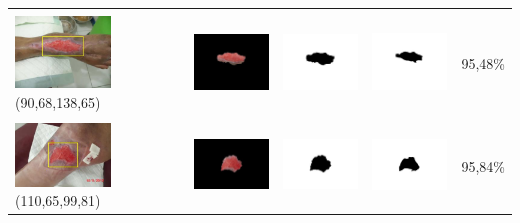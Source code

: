 \begin{table}[H]
\begin{tabular}{|m{1.0in}|m{1.0in}|m{1.0in}|m{1.0in}|m{0.6in}|}
		&  &  & \\
		\includegraphics[width=1.0in]{gambar/hasil_segmentasi/luka_merah/image_6_rect.jpg} {\centering\fontsize{10}{10}\selectfont(90,68,138,65)}&
		\includegraphics[width=1.0in]{gambar/hasil_segmentasi/luka_merah/result_6.jpg}&
		\includegraphics[width=1.0in]{gambar/hasil_segmentasi/luka_merah/mask_r_6.jpg}&
		\includegraphics[width=1.0in]{gambar/hasil_segmentasi/luka_merah/6_r.jpg}&
		95,48\% \\
		\hline

		&  &  & \\
		\includegraphics[width=1.0in]{gambar/hasil_segmentasi/luka_merah/image_7_rect.jpg} {\centering\fontsize{10}{10}\selectfont(110,65,99,81)}&
		\includegraphics[width=1.0in]{gambar/hasil_segmentasi/luka_merah/result_7.jpg}&
		\includegraphics[width=1.0in]{gambar/hasil_segmentasi/luka_merah/mask_r_7.jpg}&
		\includegraphics[width=1.0in]{gambar/hasil_segmentasi/luka_merah/7_r.jpg}&
		95,84\% \\
		\hline
	\end{tabular}
\end{table}

